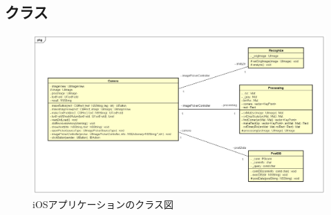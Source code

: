 \subsection{クラス}
\begin{figure}
\begin{center}
\includegraphics[width=16cm]{fig/class_ios.png}
\end{center}
\caption{iOSアプリケーションのクラス図}
\end{figure}

